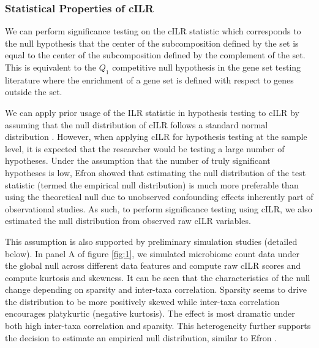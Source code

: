 \documentclass{article}
\begin{document}
\subsubsection*{Statistical Properties of cILR}
We can perform significance testing on the cILR statistic which corresponds to the null hypothesis that the center of the subcomposition defined by the set is equal to the center of the subcomposition defined by the complement of the set. This is equivalent to the $Q_1$ competitive null hypothesis in the gene set testing literature \cite{tian2005} where the enrichment of a gene set is defined with respect to genes outside the set. 

We can apply prior usage of the ILR statistic in hypothesis testing to cILR by assuming that the null distribution of cILR follows a standard normal distribution \cite{egozcue2005}. However, when applying cILR for hypothesis testing at the sample level, it is expected that the researcher would be testing a large number of hypotheses. Under the assumption that the number of truly significant hypotheses is low, Efron \cite{efron2004} showed that estimating the null distribution of the test statistic (termed the empirical null distribution) is much more preferable than using the theoretical null due to unobserved confounding effects inherently part of observational studies. As such, to perform significance testing using cILR, we also estimated the null distribution from observed raw cILR variables. 

This assumption is also supported by preliminary simulation studies (detailed below). In panel A of figure \ref{fig:1}, we simulated microbiome count data under the global null across different data features and compute raw cILR scores and compute kurtosis and skewness. It can be seen that the characteristics of the null change depending on sparsity and inter-taxa correlation. Sparsity seems to drive the distribution to be more positively skewed while inter-taxa correlation encourages platykurtic (negative kurtosis). The effect is most dramatic under both high inter-taxa correlation and sparsity. This heterogeneity further supports the decision to estimate an empirical null distribution, similar to Efron \cite{efron2004}. 
\end{document}
